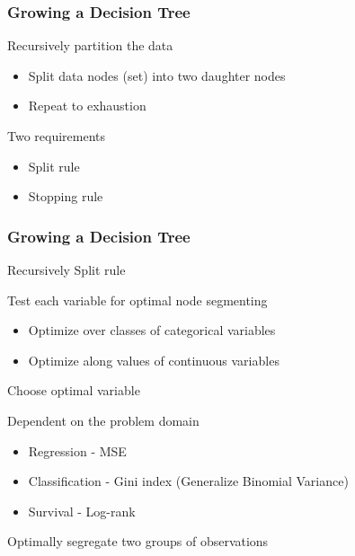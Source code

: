 \documentclass[xcolor=svgnames]{beamer}\usepackage[]{graphicx}\usepackage[]{color}
\begin{document}
\begin{frame}
\frametitle{Growing a Decision Tree}

Recursively partition the data

\begin{itemize}
\item Split data nodes (set) into two daughter nodes
\item Repeat to exhaustion
\end{itemize}

Two requirements

\begin{itemize}
\item Split rule
\item Stopping rule
\end{itemize}

\end{frame}
\begin{frame}
\frametitle{Growing a Decision Tree}

Recursively
Split rule

Test each variable for optimal node segmenting

\begin{itemize}
\item Optimize over classes of categorical variables
\item Optimize along values of continuous variables
\end{itemize}

Choose optimal variable

Dependent on the problem domain

\begin{itemize}
\item Regression - MSE
\item Classification - Gini index (Generalize Binomial Variance)
\item Survival - Log-rank
\end{itemize}

Optimally segregate two groups of observations



\end{frame}
\end{document}
